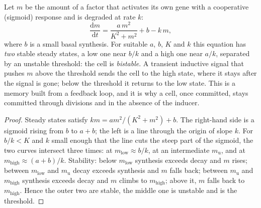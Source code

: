 \begin{theorem}\label{thm:b2:cell-differentiation:switch}
Let $m$ be the amount of a factor that activates its own gene with a
cooperative (sigmoid) response and is degraded at rate $k$:
\[
\frac{\mathrm{d}m}{\mathrm{d}t} = \frac{a\,m^{2}}{K^{2} + m^{2}} + b - k\,m,
\]
where $b$ is a small basal synthesis. For suitable $a$, $b$, $K$ and
$k$ this equation has \emph{two} stable steady states, a low one
near $b/k$ and a high one near $a/k$, separated by an unstable
threshold: the cell is \emph{bistable}. A transient inductive
signal that pushes $m$ above the threshold sends the cell to the
high state, where it stays after the signal is gone; below the
threshold it returns to the low state. This is a memory built from
a feedback loop, and it is why a cell, once committed, stays
committed through divisions and in the absence of the inducer.
\end{theorem}
\begin{proof}
Steady states satisfy $k m = a m^{2}/(K^{2} + m^{2}) + b$. The
right-hand side is a sigmoid rising from $b$ to $a + b$; the left is
a line through the origin of slope $k$. For $b/k < K$ and $k$ small
enough that the line cuts the steep part of the sigmoid, the two
curves intersect three times: at $m_{\text{low}} \approx b/k$, at an
intermediate $m_{\text{u}}$, and at $m_{\text{high}} \approx (a +
b)/k$. Stability: below $m_{\text{low}}$ synthesis exceeds decay and
$m$ rises; between $m_{\text{low}}$ and $m_{\text{u}}$ decay exceeds
synthesis and $m$ falls back; between $m_{\text{u}}$ and
$m_{\text{high}}$ synthesis exceeds decay and $m$ climbs to
$m_{\text{high}}$; above it, $m$ falls back to $m_{\text{high}}$.
Hence the outer two are stable, the middle one is unstable and is
the threshold.
\end{proof}

